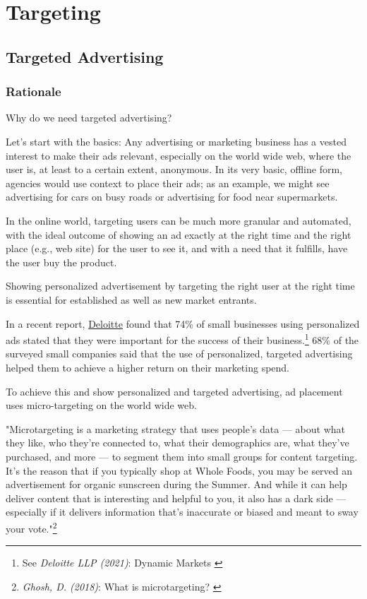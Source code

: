 %
%

\pagebreak
\section{Targeting}

\onehalfspacing

\subsection{Targeted Advertising}

\subsubsection{Rationale}

Why do we need targeted advertising?

Let's start with the basics: Any advertising or marketing business has a vested interest to make their ads relevant, especially on the world wide web, where the user is, at least to a certain extent, anonymous. In its very basic, offline form, agencies would use context to place their ads; as an example, we might see advertising for cars on busy roads or advertising for food near supermarkets.

In the online world, targeting users can be much more granular and automated, with the ideal outcome of showing an ad exactly at the right time and the right place (e.g., web site) for the user to see it, and with a need that it fulfills, have the user buy the product.

Showing personalized advertisement by targeting the right user at the right time is essential for established as well as new market entrants.

In a recent report, \href{https://www2.deloitte.com/de/de.html}{Deloitte} found that 74\% of small businesses using personalized ads stated that they were important for the success of their business.\footnote{See \textit{Deloitte LLP (2021)}: Dynamic Markets \cite{deloitteSmb}} 68\% of the surveyed small companies said that the use of personalized, targeted advertising helped them to achieve a higher return on their marketing spend.

To achieve this and show personalized and targeted advertising, ad placement uses micro-targeting on the world wide web.

"Microtargeting is a marketing strategy that uses people’s data — about what they like, who they’re connected to, what their demographics are, what they’ve purchased, and more — to segment them into small groups for content targeting. It’s the reason that if you typically shop at Whole Foods, you may be served an advertisement for organic sunscreen during the Summer. And while it can help deliver content that is interesting and helpful to you, it also has a dark side — especially if it delivers information that’s inaccurate or biased and meant to sway your vote."\footnote{\textit{Ghosh, D. (2018)}: What is microtargeting? \cite{mozillaBlog}}

